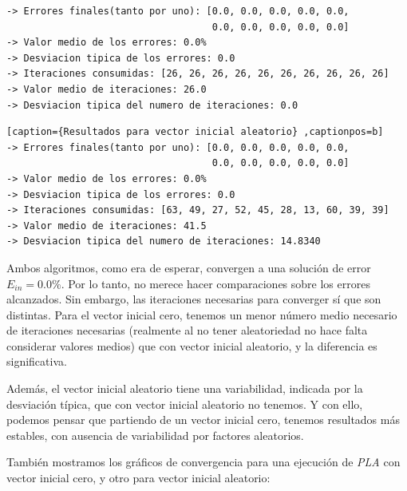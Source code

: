 \documentclass[11pt]{article}
\begin{document}
\begin{lstlisting}[caption={Resultados para vector inicial cero}, captionpos=b]
-> Errores finales(tanto por uno): [0.0, 0.0, 0.0, 0.0, 0.0,
                                    0.0, 0.0, 0.0, 0.0, 0.0]
-> Valor medio de los errores: 0.0%
-> Desviacion tipica de los errores: 0.0
-> Iteraciones consumidas: [26, 26, 26, 26, 26, 26, 26, 26, 26, 26]
-> Valor medio de iteraciones: 26.0
-> Desviacion tipica del numero de iteraciones: 0.0
\end{lstlisting}

\begin{lstlisting}[caption={Resultados para vector inicial aleatorio} ,captionpos=b]
-> Errores finales(tanto por uno): [0.0, 0.0, 0.0, 0.0, 0.0,
                                    0.0, 0.0, 0.0, 0.0, 0.0]
-> Valor medio de los errores: 0.0%
-> Desviacion tipica de los errores: 0.0
-> Iteraciones consumidas: [63, 49, 27, 52, 45, 28, 13, 60, 39, 39]
-> Valor medio de iteraciones: 41.5
-> Desviacion tipica del numero de iteraciones: 14.8340
\end{lstlisting}

Ambos algoritmos, como era de esperar, convergen a una solución de error $E_{in} = 0.0\%$. Por lo tanto, no merece hacer comparaciones sobre los errores alcanzados. Sin embargo, las iteraciones necesarias para converger sí que son distintas. Para el vector inicial cero, tenemos un menor número medio necesario de iteraciones necesarias (realmente al no tener aleatoriedad no hace falta considerar valores medios) que con vector inicial aleatorio, y la diferencia es significativa.

Además, el vector inicial aleatorio tiene una variabilidad, indicada por la desviación típica, que con vector inicial aleatorio no tenemos. Y con ello, podemos pensar que partiendo de un vector inicial cero, tenemos resultados más estables, con ausencia de variabilidad por factores aleatorios.

También mostramos los gráficos de convergencia para una ejecución de \emph{PLA} con vector inicial cero, y otro para vector inicial aleatorio:
\end{document}
